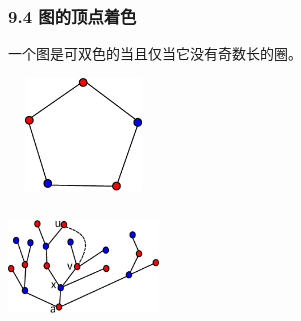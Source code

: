 \documentclass{beamer}
\begin{document}
\begin{CJK}{UTF8}{gbsn}
\begin{frame}
  \frametitle{9.4 图的顶点着色}
  \begin{theorem9.4.1}
    一个图是可双色的当且仅当它没有奇数长的圈。
  \end{theorem9.4.1}
\vspace{1cm}
  \begin{minipage}{0.45\linewidth}
\includegraphics[width=4cm,height=3cm]{pentagon5}    
  \end{minipage}
  \begin{minipage}{0.45\linewidth}
    \includegraphics[width=4cm,height=3cm]{color26}
  \end{minipage}
\end{frame}


\end{CJK}
\end{document}
